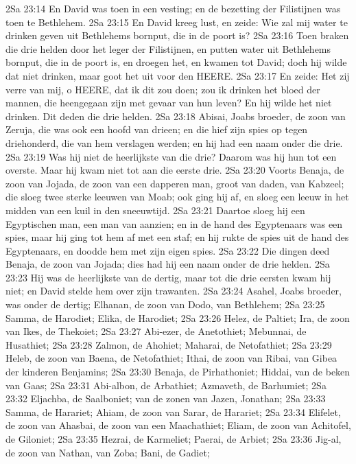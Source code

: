 2Sa 23:14  En David was toen in een vesting; en de bezetting der Filistijnen was toen te Bethlehem.
2Sa 23:15  En David kreeg lust, en zeide: Wie zal mij water te drinken geven uit Bethlehems bornput, die in de poort is?
2Sa 23:16  Toen braken die drie helden door het leger der Filistijnen, en putten water uit Bethlehems bornput, die in de poort is, en droegen het, en kwamen tot David; doch hij wilde dat niet drinken, maar goot het uit voor den HEERE.
2Sa 23:17  En zeide: Het zij verre van mij, o HEERE, dat ik dit zou doen; zou ik drinken het bloed der mannen, die heengegaan zijn met gevaar van hun leven? En hij wilde het niet drinken. Dit deden die drie helden.
2Sa 23:18  Abisai, Joabs broeder, de zoon van Zeruja, die was ook een hoofd van drieen; en die hief zijn spies op tegen driehonderd, die van hem verslagen werden; en hij had een naam onder die drie.
2Sa 23:19  Was hij niet de heerlijkste van die drie? Daarom was hij hun tot een overste. Maar hij kwam niet tot aan die eerste drie.
2Sa 23:20  Voorts Benaja, de zoon van Jojada, de zoon van een dapperen man, groot van daden, van Kabzeel; die sloeg twee sterke leeuwen van Moab; ook ging hij af, en sloeg een leeuw in het midden van een kuil in den sneeuwtijd.
2Sa 23:21  Daartoe sloeg hij een Egyptischen man, een man van aanzien; en in de hand des Egyptenaars was een spies, maar hij ging tot hem af met een staf; en hij rukte de spies uit de hand des Egyptenaars, en doodde hem met zijn eigen spies.
2Sa 23:22  Die dingen deed Benaja, de zoon van Jojada; dies had hij een naam onder de drie helden.
2Sa 23:23  Hij was de heerlijkste van de dertig, maar tot die drie eersten kwam hij niet; en David stelde hem over zijn trawanten.
2Sa 23:24  Asahel, Joabs broeder, was onder de dertig; Elhanan, de zoon van Dodo, van Bethlehem;
2Sa 23:25  Samma, de Harodiet; Elika, de Harodiet;
2Sa 23:26  Helez, de Paltiet; Ira, de zoon van Ikes, de Thekoiet;
2Sa 23:27  Abi-ezer, de Anetothiet; Mebunnai, de Husathiet;
2Sa 23:28  Zalmon, de Ahohiet; Maharai, de Netofathiet;
2Sa 23:29  Heleb, de zoon van Baena, de Netofathiet; Ithai, de zoon van Ribai, van Gibea der kinderen Benjamins;
2Sa 23:30  Benaja, de Pirhathoniet; Hiddai, van de beken van Gaas;
2Sa 23:31  Abi-albon, de Arbathiet; Azmaveth, de Barhumiet;
2Sa 23:32  Eljachba, de Saalboniet; van de zonen van Jazen, Jonathan;
2Sa 23:33  Samma, de Harariet; Ahiam, de zoon van Sarar, de Harariet;
2Sa 23:34  Elifelet, de zoon van Ahasbai, de zoon van een Maachathiet; Eliam, de zoon van Achitofel, de Giloniet;
2Sa 23:35  Hezrai, de Karmeliet; Paerai, de Arbiet;
2Sa 23:36  Jig-al, de zoon van Nathan, van Zoba; Bani, de Gadiet;
